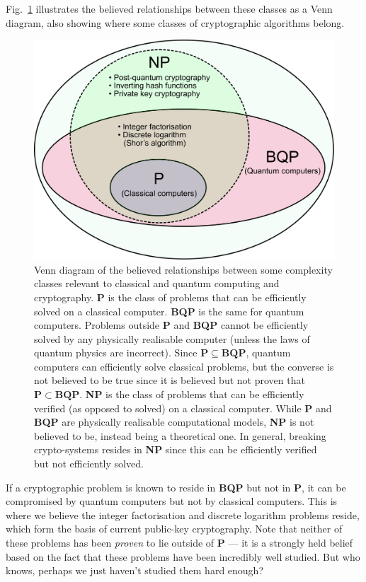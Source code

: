 Fig.~\ref{fig:complexity} illustrates the believed relationships between these classes as a Venn diagram, also showing where some classes of cryptographic algorithms belong.

\begin{figure}[!htb]
	\centering
	\includegraphics[width=\columnwidth]{figures/Complexity_classes}
	\caption{Venn diagram of the believed relationships between some complexity classes relevant to classical and quantum computing and cryptography. \textbf{P} is the class of problems that can be efficiently solved on a classical computer. \textbf{BQP} is the same for quantum computers. Problems outside \textbf{P} and \textbf{BQP} cannot be efficiently solved by any physically realisable computer (unless the laws of quantum physics are incorrect). Since $\mathbf{P}\subseteq\mathbf{BQP}$, quantum computers can efficiently solve classical problems, but the converse is not believed to be true since it is believed but not proven that $\mathbf{P}\subset\mathbf{BQP}$. \textbf{NP} is the class of problems that can be efficiently verified (as opposed to solved) on a classical computer. While \textbf{P} and \textbf{BQP} are physically realisable computational models, \textbf{NP} is not believed to be, instead being a theoretical one. In general, breaking crypto-systems resides in \textbf{NP} since this can be efficiently verified but not efficiently solved.} \label{fig:complexity}
\end{figure}

If a cryptographic problem is known to reside in \textbf{BQP} but not in \textbf{P}, it can be compromised by quantum computers but not by classical computers. This is where we believe the integer factorisation and discrete logarithm problems reside, which form the basis of current public-key cryptography. Note that neither of these problems has been \emph{proven} to lie outside of \textbf{P} --- it is a strongly held belief based on the fact that these problems have been incredibly well studied. But who knows, perhaps we just haven't studied them hard enough?

